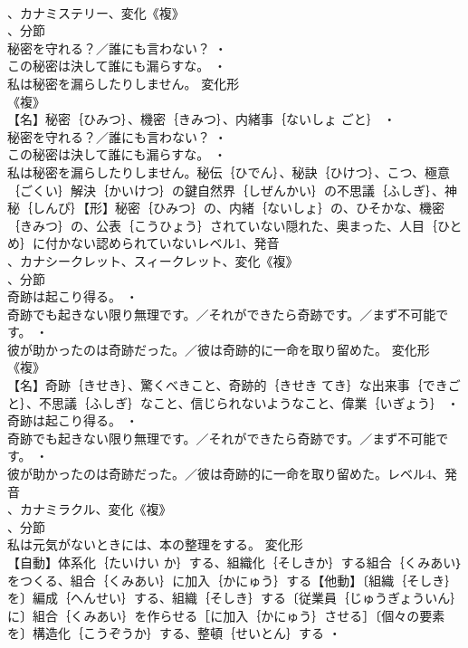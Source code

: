 \documentclass[8pt]{extreport}
\begin{document}
\begin{CJK}{UTF8}{min}
\\	、カナミステリー、変化《複》
\\	、分節
\\	秘密を守れる？／誰にも言わない？ ・
\\	この秘密は決して誰にも漏らすな。 ・
\\	私は秘密を漏らしたりしません。	変化形 
\\	《複》
\\	【名】秘密｛ひみつ｝、機密｛きみつ｝、内緒事｛ないしょ ごと｝ ・
\\	秘密を守れる？／誰にも言わない？ ・
\\	この秘密は決して誰にも漏らすな。 ・
\\	私は秘密を漏らしたりしません。秘伝｛ひでん｝、秘訣｛ひけつ｝、こつ、極意｛ごくい｝解決｛かいけつ｝の鍵自然界｛しぜんかい｝の不思議｛ふしぎ｝、神秘｛しんぴ｝【形】秘密｛ひみつ｝の、内緒｛ないしょ｝の、ひそかな、機密｛きみつ｝の、公表｛こうひょう｝されていない隠れた、奥まった、人目｛ひとめ｝に付かない認められていないレベル1、発音
\\	、カナシークレット、スィークレット、変化《複》
\\	、分節
\\	奇跡は起こり得る。 ・
\\	奇跡でも起きない限り無理です。／それができたら奇跡です。／まず不可能です。 ・
\\	彼が助かったのは奇跡だった。／彼は奇跡的に一命を取り留めた。	変化形 
\\	《複》
\\	【名】奇跡｛きせき｝、驚くべきこと、奇跡的｛きせき てき｝な出来事｛できごと｝、不思議｛ふしぎ｝なこと、信じられないようなこと、偉業｛いぎょう｝ ・
\\	奇跡は起こり得る。 ・
\\	奇跡でも起きない限り無理です。／それができたら奇跡です。／まず不可能です。 ・
\\	彼が助かったのは奇跡だった。／彼は奇跡的に一命を取り留めた。レベル4、発音
\\	、カナミラクル、変化《複》
\\	、分節
\\	私は元気がないときには、本の整理をする。	変化形 
\\	【自動】体系化｛たいけい か｝する、組織化｛そしきか｝する組合｛くみあい｝をつくる、組合｛くみあい｝に加入｛かにゅう｝する【他動】〔組織｛そしき｝を〕編成｛へんせい｝する、組織｛そしき｝する〔従業員｛じゅうぎょういん｝に〕組合｛くみあい｝を作らせる［に加入｛かにゅう｝させる］〔個々の要素を〕構造化｛こうぞうか｝する、整頓｛せいとん｝する ・

\end{CJK}
\end{document}
